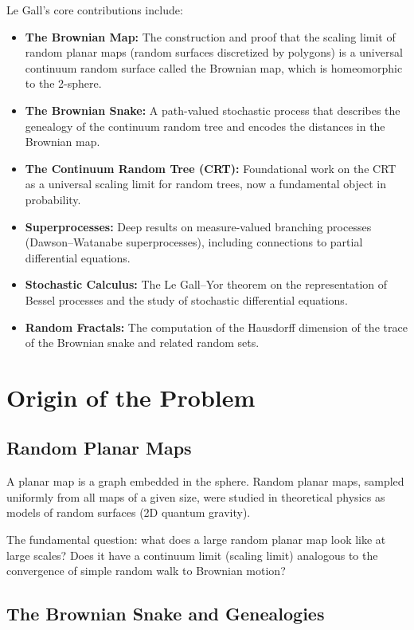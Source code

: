Le Gall's core contributions include:
\begin{itemize}
    \item \textbf{The Brownian Map:} The construction and proof that the scaling limit of random planar maps (random surfaces discretized by polygons) is a universal continuum random surface called the Brownian map, which is homeomorphic to the 2-sphere.
    \item \textbf{The Brownian Snake:} A path-valued stochastic process that describes the genealogy of the continuum random tree and encodes the distances in the Brownian map.
    \item \textbf{The Continuum Random Tree (CRT):} Foundational work on the CRT as a universal scaling limit for random trees, now a fundamental object in probability.
    \item \textbf{Superprocesses:} Deep results on measure-valued branching processes (Dawson--Watanabe superprocesses), including connections to partial differential equations.
    \item \textbf{Stochastic Calculus:} The Le Gall--Yor theorem on the representation of Bessel processes and the study of stochastic differential equations.
    \item \textbf{Random Fractals:} The computation of the Hausdorff dimension of the trace of the Brownian snake and related random sets.
\end{itemize}

\section{Origin of the Problem}

\subsection{Random Planar Maps}

A planar map is a graph embedded in the sphere. Random planar maps, sampled uniformly from all maps of a given size, were studied in theoretical physics as models of random surfaces (2D quantum gravity).

The fundamental question: what does a large random planar map look like at large scales? Does it have a continuum limit (scaling limit) analogous to the convergence of simple random walk to Brownian motion?

\subsection{The Brownian Snake and Genealogies}

